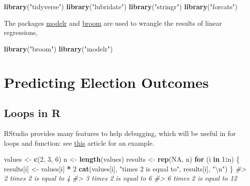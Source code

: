 \documentclass[]{book}
\newenvironment{Shaded}{\begin{snugshade}}{\end{snugshade}}
\newcommand{\CharTok}[1]{\textcolor[rgb]{0.31,0.60,0.02}{#1}}
\newcommand{\CommentTok}[1]{\textcolor[rgb]{0.56,0.35,0.01}{\textit{#1}}}
\newcommand{\ControlFlowTok}[1]{\textcolor[rgb]{0.13,0.29,0.53}{\textbf{#1}}}
\newcommand{\DecValTok}[1]{\textcolor[rgb]{0.00,0.00,0.81}{#1}}
\newcommand{\KeywordTok}[1]{\textcolor[rgb]{0.13,0.29,0.53}{\textbf{#1}}}
\newcommand{\NormalTok}[1]{#1}
\newcommand{\OperatorTok}[1]{\textcolor[rgb]{0.81,0.36,0.00}{\textbf{#1}}}
\newcommand{\OtherTok}[1]{\textcolor[rgb]{0.56,0.35,0.01}{#1}}
\newcommand{\StringTok}[1]{\textcolor[rgb]{0.31,0.60,0.02}{#1}}
\theoremstyle{definition}
\theoremstyle{definition}
\theoremstyle{definition}
\theoremstyle{remark}
\begin{document}
\begin{Shaded}
\begin{Highlighting}[]
\KeywordTok{library}\NormalTok{(}\StringTok{"tidyverse"}\NormalTok{)}
\KeywordTok{library}\NormalTok{(}\StringTok{"lubridate"}\NormalTok{)}
\KeywordTok{library}\NormalTok{(}\StringTok{"stringr"}\NormalTok{)}
\KeywordTok{library}\NormalTok{(}\StringTok{"forcats"}\NormalTok{)}
\end{Highlighting}
\end{Shaded}

The packages \href{https://cran.r-project.org/package=modelr}{modelr}
and \href{https://cran.r-project.org/package=broom}{broom} are used to
wrangle the results of linear regressions,

\begin{Shaded}
\begin{Highlighting}[]
\KeywordTok{library}\NormalTok{(}\StringTok{"broom"}\NormalTok{)}
\KeywordTok{library}\NormalTok{(}\StringTok{"modelr"}\NormalTok{)}
\end{Highlighting}
\end{Shaded}

\hypertarget{predicting-election-outcomes}{%
\section{Predicting Election
Outcomes}\label{predicting-election-outcomes}}

\hypertarget{loops-in-r}{%
\subsection{Loops in R}\label{loops-in-r}}

RStudio provides many features to help debugging, which will be useful
in for loops and function: see
\href{https://support.rstudio.com/hc/en-us/articles/205612627-Debugging-with-RStudio}{this}
article for an example.

\begin{Shaded}
\begin{Highlighting}[]
\NormalTok{values <-}\StringTok{ }\KeywordTok{c}\NormalTok{(}\DecValTok{2}\NormalTok{, }\DecValTok{3}\NormalTok{, }\DecValTok{6}\NormalTok{)}
\NormalTok{n <-}\StringTok{ }\KeywordTok{length}\NormalTok{(values)}
\NormalTok{results <-}\StringTok{ }\KeywordTok{rep}\NormalTok{(}\OtherTok{NA}\NormalTok{, n)}
\ControlFlowTok{for}\NormalTok{ (i }\ControlFlowTok{in} \DecValTok{1}\OperatorTok{:}\NormalTok{n) \{}
\NormalTok{  results[i] <-}\StringTok{ }\NormalTok{values[i] }\OperatorTok{*}\StringTok{ }\DecValTok{2}
  \KeywordTok{cat}\NormalTok{(values[i], }\StringTok{"times 2 is equal to"}\NormalTok{, results[i], }\StringTok{"}\CharTok{\textbackslash{}n}\StringTok{"}\NormalTok{)}
\NormalTok{\}}
\CommentTok{#> 2 times 2 is equal to 4 }
\CommentTok{#> 3 times 2 is equal to 6 }
\CommentTok{#> 6 times 2 is equal to 12}
\end{Highlighting}
\end{Shaded}
\end{document}
